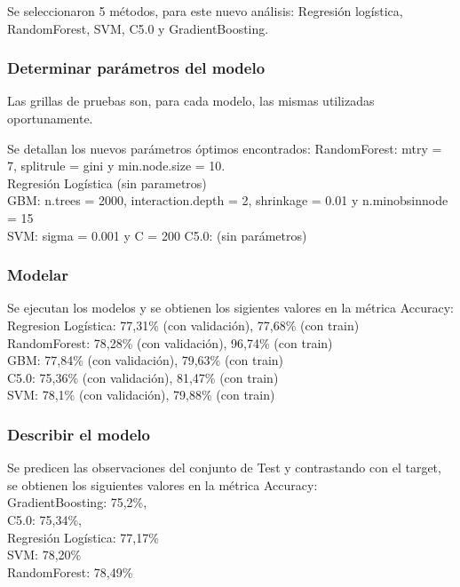 
Se seleccionaron 5 métodos, para este nuevo análisis: Regresión logística, RandomForest, SVM, C5.0 y GradientBoosting.


\subsubsection{Determinar parámetros del modelo}

Las grillas de pruebas son, para cada modelo, las mismas utilizadas oportunamente.

Se detallan los nuevos parámetros óptimos encontrados: 
RandomForest: mtry = 7, splitrule = gini y min.node.size = 10.
\\
Regresión Logística (sin parametros)\\
GBM: n.trees = 2000, interaction.depth = 2, shrinkage = 0.01
y n.minobsinnode = 15\\
SVM: sigma = 0.001 y C = 200
C5.0: (sin parámetros)


\subsubsection{Modelar}

Se ejecutan los modelos y se obtienen los sigientes valores en la métrica Accuracy:\\
Regresion Logística: 77,31\% (con validación), 77,68\% (con train)\\
RandomForest: 78,28\% (con validación), 96,74\% (con train)\\
GBM: 77,84\% (con validación), 79,63\% (con train)\\
C5.0: 75,36\% (con validación), 81,47\% (con train)\\
SVM: 78,1\% (con validación), 79,88\% (con train)

\subsubsection{Describir el modelo}

Se predicen las observaciones del conjunto de Test y contrastando con el target, se obtienen los siguientes valores en la métrica Accuracy:\\
GradientBoosting: 75,2\%,\\
C5.0: 75,34\%,\\
Regresión Logística: 77,17\%\\
SVM: 78,20\%\\
RandomForest: 78,49\%


